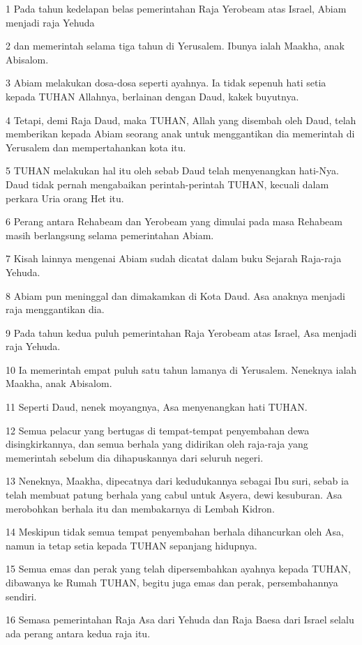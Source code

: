 \par 1 Pada tahun kedelapan belas pemerintahan Raja Yerobeam atas Israel, Abiam menjadi raja Yehuda
\par 2 dan memerintah selama tiga tahun di Yerusalem. Ibunya ialah Maakha, anak Abisalom.
\par 3 Abiam melakukan dosa-dosa seperti ayahnya. Ia tidak sepenuh hati setia kepada TUHAN Allahnya, berlainan dengan Daud, kakek buyutnya.
\par 4 Tetapi, demi Raja Daud, maka TUHAN, Allah yang disembah oleh Daud, telah memberikan kepada Abiam seorang anak untuk menggantikan dia memerintah di Yerusalem dan mempertahankan kota itu.
\par 5 TUHAN melakukan hal itu oleh sebab Daud telah menyenangkan hati-Nya. Daud tidak pernah mengabaikan perintah-perintah TUHAN, kecuali dalam perkara Uria orang Het itu.
\par 6 Perang antara Rehabeam dan Yerobeam yang dimulai pada masa Rehabeam masih berlangsung selama pemerintahan Abiam.
\par 7 Kisah lainnya mengenai Abiam sudah dicatat dalam buku Sejarah Raja-raja Yehuda.
\par 8 Abiam pun meninggal dan dimakamkan di Kota Daud. Asa anaknya menjadi raja menggantikan dia.
\par 9 Pada tahun kedua puluh pemerintahan Raja Yerobeam atas Israel, Asa menjadi raja Yehuda.
\par 10 Ia memerintah empat puluh satu tahun lamanya di Yerusalem. Neneknya ialah Maakha, anak Abisalom.
\par 11 Seperti Daud, nenek moyangnya, Asa menyenangkan hati TUHAN.
\par 12 Semua pelacur yang bertugas di tempat-tempat penyembahan dewa disingkirkannya, dan semua berhala yang didirikan oleh raja-raja yang memerintah sebelum dia dihapuskannya dari seluruh negeri.
\par 13 Neneknya, Maakha, dipecatnya dari kedudukannya sebagai Ibu suri, sebab ia telah membuat patung berhala yang cabul untuk Asyera, dewi kesuburan. Asa merobohkan berhala itu dan membakarnya di Lembah Kidron.
\par 14 Meskipun tidak semua tempat penyembahan berhala dihancurkan oleh Asa, namun ia tetap setia kepada TUHAN sepanjang hidupnya.
\par 15 Semua emas dan perak yang telah dipersembahkan ayahnya kepada TUHAN, dibawanya ke Rumah TUHAN, begitu juga emas dan perak, persembahannya sendiri.
\par 16 Semasa pemerintahan Raja Asa dari Yehuda dan Raja Baesa dari Israel selalu ada perang antara kedua raja itu.

